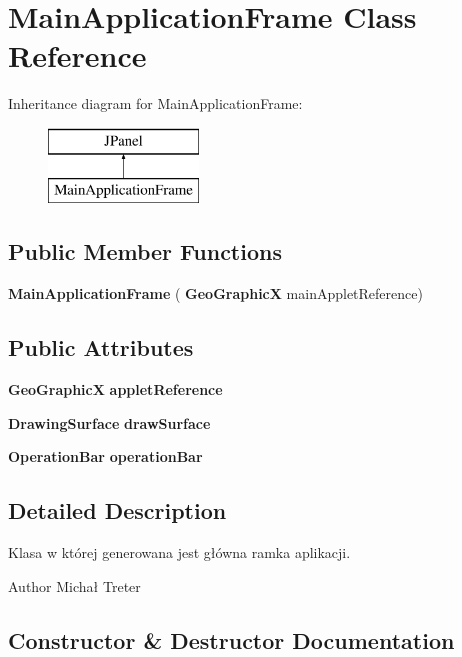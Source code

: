 \section{Main\+Application\+Frame Class Reference}
\label{class_main_application_frame}
Inheritance diagram for Main\+Application\+Frame\+:\begin{figure}[H]
\begin{center}
\leavevmode
\includegraphics[height=2.000000cm]{class_main_application_frame}
\end{center}
\end{figure}
\subsection*{Public Member Functions}
\begin{DoxyCompactItemize}
\item 
\textbf{ Main\+Application\+Frame} (\textbf{ Geo\+GraphicX} main\+Applet\+Reference)
\end{DoxyCompactItemize}
\subsection*{Public Attributes}
\begin{DoxyCompactItemize}
\item 
\textbf{ Geo\+GraphicX} \textbf{ applet\+Reference}
\item 
\textbf{ Drawing\+Surface} \textbf{ draw\+Surface}
\item 
\textbf{ Operation\+Bar} \textbf{ operation\+Bar}
\end{DoxyCompactItemize}


\subsection{Detailed Description}
Klasa w której generowana jest główna ramka aplikacji. \begin{DoxyAuthor}{Author}
Michał Treter 
\end{DoxyAuthor}


\subsection{Constructor \& Destructor Documentation}
\mbox{\label{class_main_application_frame_ad5f2f19159866db4d1ba182ea437da8e}} 
